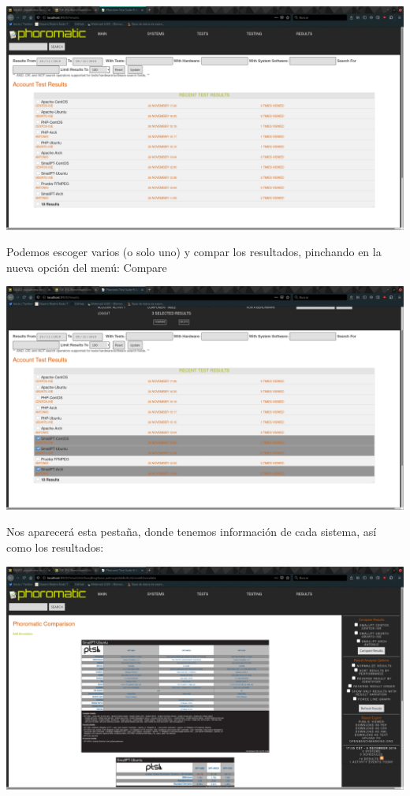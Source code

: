 \documentclass[12pt, spanish]{article}
\begin{document}
\begin{center}
\includegraphics[scale=0.25]{phoromatic_results.png}
\end{center}

Podemos escoger varios (o solo uno) y compar los resultados, pinchando en la nueva opción del menú: Compare


\begin{center}
\includegraphics[scale=0.25]{phoromatic_compare.png}
\end{center}

Nos aparecerá esta pestaña, donde tenemos información de cada sistema, así como los resultados:

\begin{center}
\includegraphics[scale=0.25]{phoromatic_datos.png}
\end{center}
\end{document}
